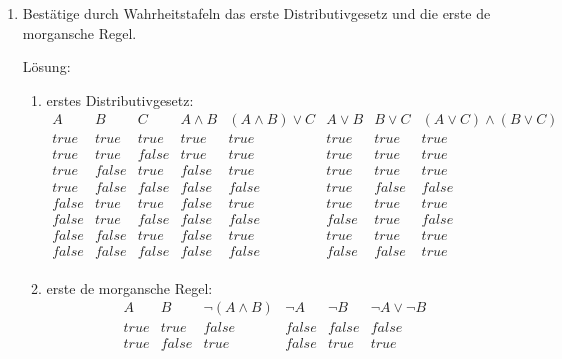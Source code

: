 \documentclass[main.tex]{subfiles}
\begin{document}
\begin{enumerate}

	\item Bestätige durch Wahrheitstafeln das erste Distributivgesetz und die erste de morgansche Regel.

	Lösung:
		\begin{enumerate}
		      \item erstes Distributivgesetz:
		            \[
			            \begin{array}{cccccccc}
				            A     & B     & C     & A \land B & (A \land B ) \lor C & A \lor B & B \lor C & (A \lor C) \land (B \lor C) \\
				            \hline
				            true  & true  & true  & true      & true                & true     & true     & true                        \\
				            true  & true  & false & true      & true                & true     & true     & true                        \\
				            true  & false & true  & false     & true                & true     & true     & true                        \\
				            true  & false & false & false     & false               & true     & false    & false                       \\
				            false & true  & true  & false     & true                & true     & true     & true                        \\
				            false & true  & false & false     & false               & false    & true     & false                       \\
				            false & false & true  & false     & true                & true     & true     & true                        \\
				            false & false & false & false     & false               & false    & false    & true                        \\
			            \end{array}
		            \]
		      \item erste de morgansche Regel:
		            \[
			            \begin{array}{cccccc}
				            A     & B     & \neg (A \land B) & \neg A & \neg B & \neg A \lor \neg B \\
				            \hline
				            true  & true  & false            & false  & false  & false              \\
				            true  & false & true             & false  & true   & true               \\

\end{array}\]
\end{enumerate}
\end{enumerate}
\end{document}
